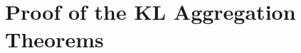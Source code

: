 \documentclass[11pt]{article}
\begin{document}

\section{Proof of the KL Aggregation Theorems}
\label{sec:autoregressive}
\end{document}
